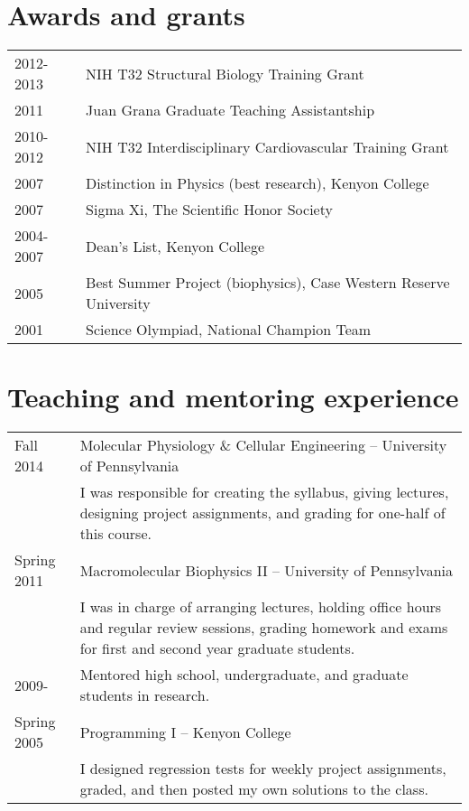 \documentclass[letterpaper,11pt]{article}
\begin{document}
\begin{tabular}{ll p{14 cm}}
\end{tabular}

\section{Awards and grants}
\begin{tabular}{ll}
2012-2013 & NIH T32 Structural Biology Training Grant\\
2011 & Juan Grana Graduate Teaching Assistantship\\
2010-2012 & NIH T32 Interdisciplinary Cardiovascular Training Grant\\
2007 & Distinction in Physics (best research), Kenyon College\\
2007 & Sigma Xi, The Scientific Honor Society\\
2004-2007 & Dean's List, Kenyon College\\
2005 & Best Summer Project (biophysics), Case Western Reserve University\\
2001 & Science Olympiad, National Champion Team
\end{tabular}

\section{Teaching and mentoring experience}
\begin{tabular}{lp{16cm}}
Fall 2014 & Molecular Physiology \& Cellular Engineering -- University of Pennsylvania\\ & 
I was responsible for creating the syllabus, giving lectures, designing project assignments, 
and grading for one-half of this course.\\

Spring 2011 & Macromolecular Biophysics II -- University of
Pennsylvania\\ & I was in charge of arranging lectures, holding office
hours and regular review sessions, grading homework and exams for
first and second year graduate students.\\ 
2009- & Mentored high school, undergraduate, and graduate students in research. \\
Spring 2005 & Programming I
-- Kenyon College\\ & I designed regression tests for weekly project
assignments, graded, and then posted my own solutions to the class.
\end{tabular}
\end{document}
